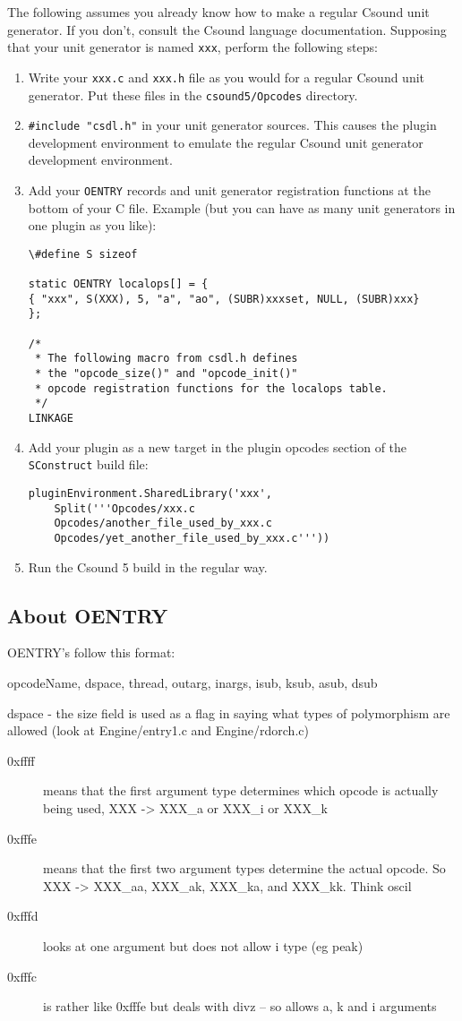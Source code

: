 \documentclass[10pt,letterpaper,onecolumn]{ltxguide}
\begin{document}
The following assumes you already know how to make a regular Csound unit generator. If you don't, consult the Csound language documentation.
Supposing that your unit generator is named \texttt{xxx}, perform the following steps:
\begin{enumerate}
\item Write your \texttt{xxx.c} and \texttt{xxx.h} file as you would for a regular Csound unit generator. Put these files in the \texttt{csound5/Opcodes} directory.
\item \texttt{\#include "csdl.h"} in your unit generator sources. This causes the plugin development environment to emulate the regular Csound unit generator development environment.
\item Add your \texttt{OENTRY} records and unit generator registration functions at the bottom of your C file. Example (but you can have as many unit generators in one plugin as you like):
\begin{verbatim}
\#define S sizeof

static OENTRY localops[] = {
{ "xxx", S(XXX), 5, "a", "ao", (SUBR)xxxset, NULL, (SUBR)xxx}
};

/*
 * The following macro from csdl.h defines 
 * the "opcode_size()" and "opcode_init()" 
 * opcode registration functions for the localops table.
 */
LINKAGE
\end{verbatim}
\item Add your plugin as a new target in the plugin opcodes section of the \texttt{SConstruct} build file:
\begin{verbatim}
pluginEnvironment.SharedLibrary('xxx', 
    Split('''Opcodes/xxx.c 
    Opcodes/another_file_used_by_xxx.c 
    Opcodes/yet_another_file_used_by_xxx.c'''))
\end{verbatim}
\item Run the Csound 5 build in the regular way.
\end{enumerate}		

\subsection{About OENTRY}

OENTRY's follow this format:

opcodeName, dspace, thread, outarg, inargs, isub, ksub, asub, dsub
  

dspace - the size field is used as a flag in saying what types of polymorphism are allowed (look at Engine/entry1.c and Engine/rdorch.c)

\begin{description}
	\item[0xffff] means that the first argument type determines which opcode is actually being used, XXX -> XXX\_a or XXX\_i or XXX\_k
	\item[0xfffe] means that the first two argument types determine the actual opcode.  So XXX -> XXX\_aa, XXX\_ak, XXX\_ka, and XXX\_kk.  Think oscil
	\item[0xfffd] looks at one argument but does not allow i type (eg peak)
	\item[0xfffc] is rather like 0xfffe but deals with divz -- so allows a, k and i arguments
\end{description}
\end{document}
